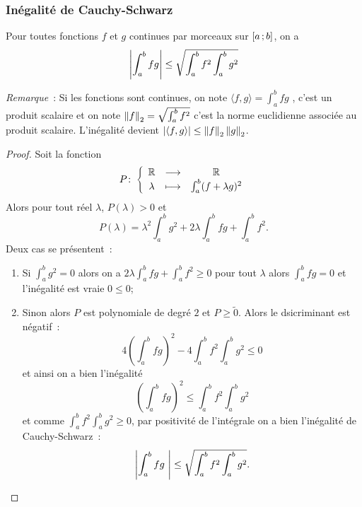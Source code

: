 \subsubsection{Inégalité de Cauchy-Schwarz}

\begin{theo}
  Pour toutes fonctions $f$ et $g$ continues par morceaux sur $\left[ a \, ;  b \right]$, on a
  \begin{equation}
   \left\lvert\int_a^b fg\right\rvert \leq \sqrt{\int_a^b f^2 \int_a^b g^2} 
  \end{equation}
\end{theo}

\emph{Remarque}~: Si les fonctions sont continues, on note $\langle f,g \rangle = \int_a^b fg$ , c'est un produit scalaire et on note $\left\lVert f\right\rVert_2 = \sqrt{\int_a^b f^2}$ c'est la norme euclidienne associée au produit scalaire. L'inégalité devient $\left\lvert\left\langle{f},{g}\right\rangle\right\rvert \leq \left\lVert f\right\rVert_2 \left\lVert g\right\rVert_2$.

\begin{proof}
  Soit la fonction
  \begin{equation}
    P\colon \left\{\begin{array}{ccc} \mathbb{R} & \longrightarrow &\mathbb{R}\\ \lambda & \longmapsto & \int_a^b (f+\lambda g)^2 \end{array} \right.
  \end{equation}
  Alors pour tout réel $\lambda$, $P(\lambda)>0$ et
  \begin{equation}
    P(\lambda)= \lambda^2 \int_a^b g^2 + 2\lambda \int_a^b fg + \int_a^b f^2.
  \end{equation}
  Deux cas se présentent~:
  \begin{enumerate}
  \item Si $\int_a^b g^2=0$ alors on a $2\lambda \int_a^b fg + \int_a^b f^2 \geq 0$ pour tout $\lambda$ alors $\int_a^b fg=0$ et l'inégalité est vraie $0 \leq 0$;
  \item Sinon alors $P$ est polynomiale de degré $2$ et $P \geq \tilde{0}$. Alors le dsicriminant est négatif~:
    \begin{equation}
      4 \left(\int_a^b fg \right)^2 - 4 \int_a^bf^2 \int_a^b g^2 \leq 0
    \end{equation}
    et ainsi on a bien l'inégalité
    \begin{equation}
      \left(\int_a^b fg \right)^2 \leq \int_a^bf^2 \int_a^b g^2
    \end{equation}
    et comme $\int_a^bf^2 \int_a^b g^2  \geq 0$, par positivité de l'intégrale on a bien l'inégalité de Cauchy-Schwarz~:
    \begin{equation}
      \left\lvert\int_a^b fg~\right\rvert \leq \sqrt{\int_a^b f^2 \int_a^b g^2}.
    \end{equation}
  \end{enumerate}
\end{proof}

